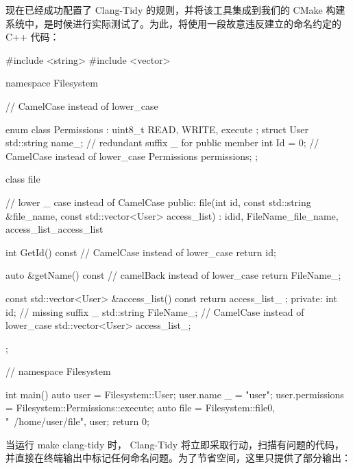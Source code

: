 现在已经成功配置了 Clang-Tidy 的规则，并将该工具集成到我们的 CMake 构建系统中，是时候进行实际测试了。为此，将使用一段故意违反建立的命名约定的 C++ 代码：

\begin{cpp}
#include <string>
#include <vector>

namespace Filesystem { // CamelCase instead of lower_case

enum class Permissions : uint8_t { READ, WRITE, execute };
struct User {
    std::string name_; // redundant suffix _ for public member
    int Id = 0; // CamelCase instead of lower_case
    Permissions permissions;
};

class file { // lower _ case instead of CamelCase
public:
    file(int id, const std::string &file_name,
        const std::vector<User> access_list)
        : id{id}, FileName_{file_name}, access_list_{access_list} {}

    int GetId() const // CamelCase instead of lower_case
    {
        return id;
    }

    auto &getName() const // camelBack instead of lower_case
    {
        return FileName_;
    }

    const std::vector<User> &access_list() const { return access_list_ ; }
    private:
    int id; // missing suffix _
    std::string FileName_; // CamelCase instead of lower_case
    std::vector<User> access_list_;
};

} // namespace Filesystem

int main() {
    auto user = Filesystem::User{};
    user.name _ = "user";
    user.permissions = Filesystem::Permissions::execute;
    auto file = Filesystem::file{0, "~/home/user/file", {user}};
    return 0;
}
\end{cpp}

当运行 make clang-tidy 时， Clang-Tidy 将立即采取行动，扫描有问题的代码，并直接在终端输出中标记任何命名问题。为了节省空间，这里只提供了部分输出：

